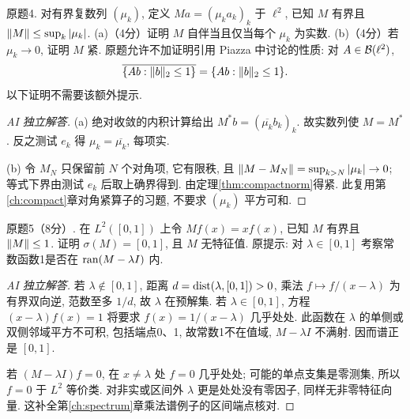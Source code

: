 \begin{exercise}\label{final:4}
原题4. 对有界复数列 $(\mu_k)$, 定义 $Ma=(\mu_ka_k)_k$ 于 $\ell^2$, 已知 $M$ 有界且 $\lVert M\rVert\le\sup_k|\mu_k|$. (a)（4分）证明 $M$ 自伴当且仅当每个 $\mu_k$ 为实数. (b)（4分）若 $\mu_k\to0$, 证明 $M$ 紧. 原题允许不加证明引用 Piazza 中讨论的性质: 对 $A\in\mathcal B(\ell^2)$,
\[
\overline{\{Ab:\lVert b\rVert_2\le1\}}=\{Ab:\lVert b\rVert_2\le1\}.
\]
以下证明不需要该额外提示.
\end{exercise}
\begin{proof}[AI 独立解答]
(a) 绝对收敛的内积计算给出 $M^*b=(\overline{\mu_k}b_k)_k$. 故实数列使 $M=M^*$. 反之测试 $e_k$ 得 $\mu_k=\overline{\mu_k}$, 每项实.

(b) 令 $M_N$ 只保留前 $N$ 个对角项, 它有限秩, 且 $\lVert M-M_N\rVert=\sup_{k>N}|\mu_k|\to0$; 等式下界由测试 $e_k$ 后取上确界得到. 由定理\ref{thm:compactnorm}得紧. 此复用第\ref{ch:compact}章对角紧算子的习题, 不要求 $(\mu_k)$ 平方可和.
\end{proof}
\begin{exercise}\label{final:5}
原题5（8分）. 在 $L^2([0,1])$ 上令 $Mf(x)=xf(x)$, 已知 $M$ 有界且 $\lVert M\rVert\le1$. 证明 $\sigma(M)=[0,1]$, 且 $M$ 无特征值. 原提示: 对 $\lambda\in[0,1]$ 考察常数函数1是否在 $\operatorname{ran}(M-\lambda I)$ 内.
\end{exercise}
\begin{proof}[AI 独立解答]
若 $\lambda\notin[0,1]$, 距离 $d=\operatorname{dist}(\lambda,[0,1])>0$, 乘法 $f\mapsto f/(x-\lambda)$ 为有界双向逆, 范数至多 $1/d$, 故 $\lambda$ 在预解集. 若 $\lambda\in[0,1]$, 方程 $(x-\lambda)f(x)=1$ 将要求 $f(x)=1/(x-\lambda)$ 几乎处处. 此函数在 $\lambda$ 的单侧或双侧邻域平方不可积, 包括端点0、1, 故常数1不在值域, $M-\lambda I$ 不满射. 因而谱正是 $[0,1]$.

若 $(M-\lambda I)f=0$, 在 $x\ne\lambda$ 处 $f=0$ 几乎处处; 可能的单点支集是零测集, 所以 $f=0$ 于 $L^2$ 等价类. 对非实或区间外 $\lambda$ 更是处处没有零因子, 同样无非零特征向量. 这补全第\ref{ch:spectrum}章乘法谱例子的区间端点核对.
\end{proof}
